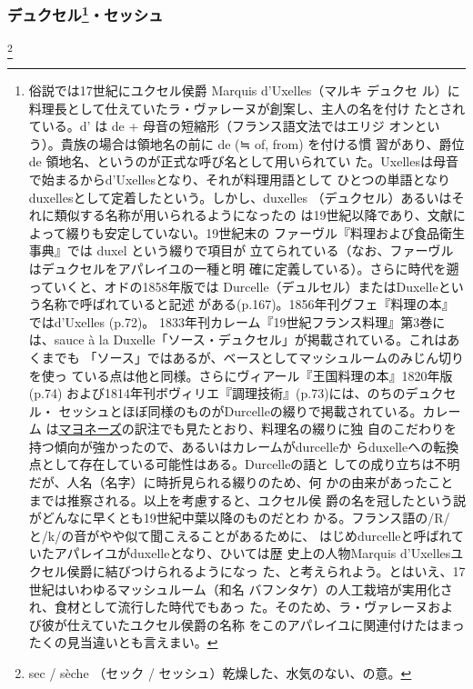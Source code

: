 \begin{recette}
{\subsubsection[デュクセル・セッシュ]{\texorpdfstring{デュクセル\footnote{俗説では17世紀にユクセル侯爵
  Marquis d'Uxelles（マルキ デュクセ
  ル）に料理長として仕えていたラ・ヴァレーヌが創案し、主人の名を付け
  たとされている。d' は de + 母音の短縮形（フランス語文法ではエリジ
  オンという）。貴族の場合は領地名の前に de (≒ of, from) を付ける慣
  習があり、爵位 de 領地名、というのが正式な呼び名として用いられてい
  た。Uxellesは母音で始まるからd'Uxellesとなり、それが料理用語として
  ひとつの単語となりduxellesとして定着したという。しかし、duxelles
  （デュクセル）あるいはそれに類似する名称が用いられるようになったの
  は19世紀以降であり、文献によって綴りも安定していない。19世紀末の
  ファーヴル『料理および食品衛生事典』では duxel という綴りで項目が
  立てられている（なお、ファーヴルはデュクセルをアパレイユの一種と明
  確に定義している）。さらに時代を遡っていくと、オドの1858年版では
  Durcelle（デュルセル）またはDuxelleという名称で呼ばれていると記述
  がある(p.167)。1856年刊グフェ『料理の本』ではd'Uxelles (p.72)。
  1833年刊カレーム『19世紀フランス料理』第3巻には、sauce à la
  Duxelle「ソース・デュクセル」が掲載されている。これはあくまでも
  「ソース」ではあるが、ベースとしてマッシュルームのみじん切りを使っ
  ている点は他と同様。さらにヴィアール『王国料理の本』1820年版(p.74)
  および1814年刊ボヴィリエ『調理技術』(p.73)には、のちのデュクセル・
  セッシュとほぼ同様のものがDurcelleの綴りで掲載されている。カレーム
  は\protect\hyperlink{mayonnaise}{マヨネーズ}の訳注でも見たとおり、料理名の綴りに独
  自のこだわりを持つ傾向が強かったので、あるいはカレームがdurcelleか
  らduxelleへの転換点として存在している可能性はある。Durcelleの語と
  しての成り立ちは不明だが、人名（名字）に時折見られる綴りのため、何
  かの由来があったことまでは推察される。以上を考慮すると、ユクセル侯
  爵の名を冠したという説がどんなに早くとも19世紀中葉以降のものだとわ
  かる。フランス語の/R/と/k/の音がやや似て聞こえることがあるために、
  はじめdurcelleと呼ばれていたアパレイユがduxelleとなり、ひいては歴
  史上の人物Marquis d'Uxellesユクセル侯爵に結びつけられるようになっ
  た、と考えられよう。とはいえ、17世紀はいわゆるマッシュルーム（和名
  バフンタケ）の人工栽培が実用化され、食材として流行した時代でもあっ
  た。そのため、ラ・ヴァレーヌおよび彼が仕えていたユクセル侯爵の名称
  をこのアパレイユに関連付けたはまったくの見当違いとも言えまい。}・セッシュ}{デュクセル・セッシュ}}\label{duxelles-seche}}

\footnote{sec / sèche （セック /
  セッシュ）乾燥した、水気のない、の意。}


\end{recette}
